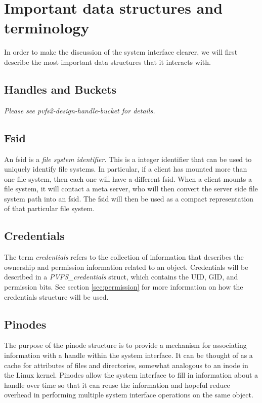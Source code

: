 \documentclass[11pt, letterpaper]{article}
\begin{document}
\section{Important data structures and terminology}

In order to make the discussion of the system interface clearer, we will
first describe the most important data structures that it interacts
with.

\subsection{Handles and Buckets}

\emph{Please see pvfs2-design-handle-bucket for details.}

\subsection{Fsid}

An fsid is a \emph{file system identifier}.  This is a integer
identifier that can be used to uniquely identify file systems.  In
particular, if a client has mounted more than one file system, then each
one will have a different fsid.  When a client mounts a file system, it
will contact a meta server, who will then convert the server side file
system path into an fsid.  The fsid will then be used as a compact
representation of that particular file system.

\subsection{Credentials}

The term \emph{credentials} refers to the collection of
information that describes the ownership and permission information
related to an object.  Credentials will be described in a
\emph{PVFS\_credentials} struct, which contains the UID, GID, and
permission bits.  See section \ref{sec:permission} for more information
on how the credentials structure will be used.

\subsection{Pinodes}

The purpose of the pinode structure is to provide a mechanism for
associating information with a handle within the system interface.
It can be thought of as a cache for attributes of files and
directories, somewhat analogous to an inode in the Linux kernel.
Pinodes allow the system interface to fill in information about a handle
over time so that it can reuse the information and hopeful reduce overhead
in performing multiple system interface operations on the same object.
\end{document}
